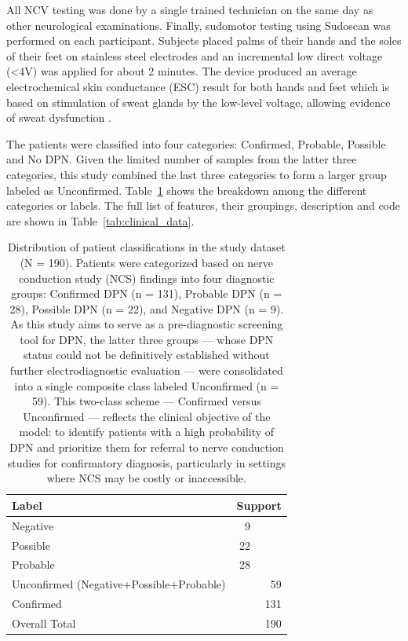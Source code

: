 \documentclass[pdflatex,sn-vancouver-num]{sn-jnl}
\begin{document}
All NCV testing was done by a single trained technician on the same day as other
neurological examinations. Finally, sudomotor testing using Sudoscan was performed on each participant. Subjects placed palms of their hands and the soles of their feet on stainless steel electrodes and an incremental low direct voltage (<4V) was applied for about 2 minutes. The device produced an average electrochemical skin conductance (ESC) result for both hands and feet which is based on stimulation of sweat glands by the low-level voltage, allowing evidence of sweat dysfunction \cite{garcia2022detection}.

The patients were classified into four categories: Confirmed, Probable, Possible and No DPN.  Given the limited number of samples from the latter three categories, this study combined the last three categories to form a larger group  labeled as Unconfirmed. Table~\ref{tab:data_categ} shows the breakdown among the different categories or labels. The full list of features, their groupings, description and code are shown in Table~\ref{tab:clinical_data}.

\begin{table}[h!]
\centering
\small
\begin{tabular}{lrr}
\toprule
Label & \multicolumn{2}{c}{Support}  \\
\midrule
Negative  &  9 \\
Possible  & 22 \\
Probable  & 28  \\
Unconfirmed (Negative+Possible+Probable) & &59 \\
Confirmed & & 131 \\
Overall Total & & 190 \\
\bottomrule
\end{tabular}
\caption{Distribution of patient classifications in the study dataset (N = 190). Patients were categorized based on nerve conduction study (NCS) findings into four diagnostic groups: Confirmed DPN (n = 131), Probable DPN (n = 28), Possible DPN (n = 22), and Negative DPN (n = 9). As this study aims to serve as a pre-diagnostic screening tool for DPN, the latter three groups — whose DPN status could not be definitively established without further electrodiagnostic evaluation — were consolidated into a single composite class labeled Unconfirmed (n = 59). This two-class scheme — Confirmed versus Unconfirmed — reflects the clinical objective of the model: to identify patients with a high probability of DPN and prioritize them for referral to nerve conduction studies for confirmatory diagnosis, particularly in settings where NCS may be costly or inaccessible.}
\label{tab:data_categ}
\end{table}
\end{document}
